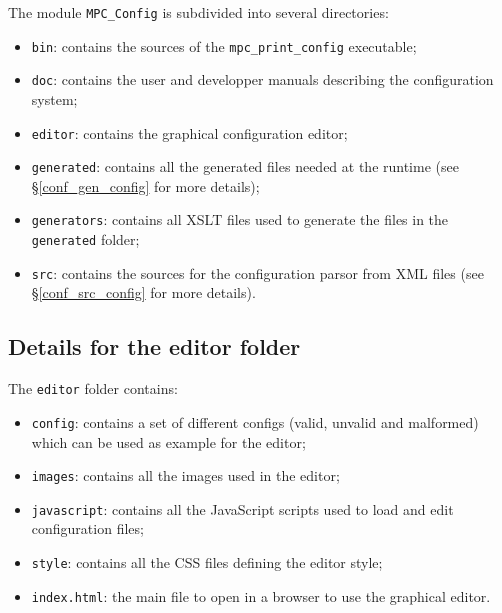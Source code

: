 \documentclass{article}
\begin{document}
The module \texttt{MPC\_Config} is subdivided into several directories:
\begin{itemize}
\item \texttt{bin}: contains the sources of the \texttt{mpc\_print\_config} executable;
\item \texttt{doc}: contains the user and developper manuals describing the configuration system;
\item \texttt{editor}: contains the graphical configuration editor;
\item \texttt{generated}: contains all the generated files needed at the runtime (see §\ref{conf_gen_config} for more details);
\item \texttt{generators}: contains all XSLT files used to generate the files in the \texttt{generated} folder;
\item \texttt{src}: contains the sources for the configuration parsor from XML files (see §\ref{conf_src_config} for more details).
\end{itemize}

\subsection{Details for the editor folder}
\label{conf_editor_config}
The \texttt{editor} folder contains:
\begin{itemize}
\item \texttt{config}: contains a set of different configs (valid, unvalid and malformed) which can be used as example for the editor;
\item \texttt{images}: contains all the images used in the editor;
\item \texttt{javascript}: contains all the JavaScript scripts used to load and edit configuration files;
\item \texttt{style}: contains all the CSS files defining the editor style;
\item \texttt{index.html}: the main file to open in a browser to use the graphical editor.
\end{itemize}
\end{document}
